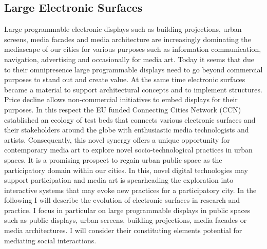 

\subsection{Large Electronic Surfaces}

Large programmable electronic displays such as building projections, urban screens, media facades and media architecture are increasingly dominating the mediascape of our cities for various purposes such as information communication, navigation, advertising and occasionally for media art. 
Today it seems that due to their omnipresence large programmable displays need to go beyond commercial purposes to stand out and create value.
At the same time electronic surfaces became a material to support architectural concepts and to implement structures. Price decline allows non-commercial initiatives to embed displays for their purposes. 
In this respect the EU funded Connecting Cities Network (CCN) established an ecology of test beds that connects various electronic surfaces and their stakeholders around the globe with enthusiastic media technologists and artists. 
Consequently, this novel synergy offers a unique opportunity for contemporary media art to explore novel socio-technological practices in urban spaces. 
It is a promising prospect to regain urban public space as the participatory domain within our cities. 
In this, novel digital technologies may support participation and media art is spearheading the exploration into interactive systems that may evoke new practices for a participatory city. 
In the following I will describe the evolution of electronic surfaces in research and practice.
I focus in particular on large programmable displays in public spaces such as public displays, urban screens, building projections, media facades or media architectures. I will consider their constituting elements potential for mediating social interactions.


